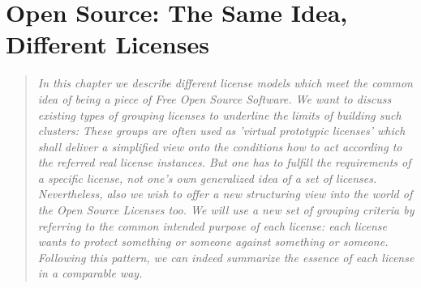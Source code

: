 %
%
%
%
%

\chapter{Open Source: The Same Idea, Different Licenses}\label{sec:LicenseTaxonomies}

\footnotesize \begin{quote}\itshape In this chapter we describe different
license models which meet the common idea of being a piece of Free Open Source
Software. We want to discuss existing types of grouping licenses to underline
the limits of building such clusters: These groups are often used as 'virtual
prototypic licenses' which shall deliver a simplified view onto the conditions
how to act according to the referred real license instances. But one has to
fulfill the requirements of a specific license, not one's own generalized idea
of a set of licenses. Nevertheless, also we wish to offer a new structuring view
into the world of the Open Source Licenses too. We will use a new set of
grouping criteria by referring to the common intended purpose of each license:
each license wants to protect something or someone against something or someone.
Following this pattern, we can indeed summarize the essence of each license in a
comparable way.
\end{quote}
\normalsize{}

